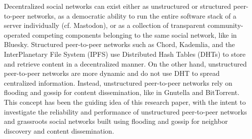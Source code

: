 Decentralized social networks can exist either as unstructured or structured peer-to-peer networks, as a democratic ability to run the entire software stack of a server individually (cf. Mastodon), or as a collection of transparent community-operated competing components belonging to the same social network, like in Bluesky.
Structured peer-to-peer networks such as Chord, Kademlia, and the InterPlanetary File System (IPFS) use Distributed Hash Tables (DHTs) to store and retrieve content in a decentralized manner. 
On the other hand, unstructured peer-to-peer networks are more dynamic and do not use DHT to spread centralized information. Instead, unstructured peer-to-peer networks rely on flooding and gossip for content dissemination, like in Gnutella and BitTorrent.
This concept has been the guiding idea of this research paper, with the intent to investigate the reliability and performance of unstructured peer-to-peer networks and grassroots social networks built using flooding and gossip for neighbor discovery and content dissemination.